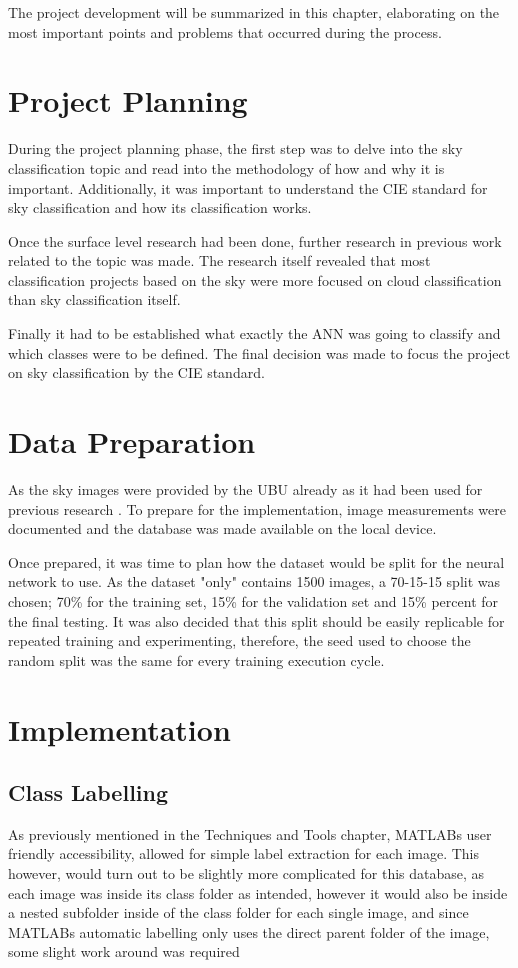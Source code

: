 
The project development will be summarized in this chapter, elaborating on the most important points and problems that occurred during the process.
\section{Project Planning}
During the project planning phase, the first step was to delve into the sky classification topic and read into the methodology of how and why it is important. Additionally, it was important to understand the CIE standard for sky classification and how its classification works. 

Once the surface level research had been done, further research in previous work related to the topic was made. The research itself revealed that most classification projects based on the sky were more focused on cloud classification than sky classification itself. 

Finally it had to be established what exactly the ANN was going to classify and which classes were to be defined. The final decision was made to focus the project on sky classification by the CIE standard.

\section{Data Preparation}
As the sky images were provided by the UBU already as it had been used for previous research \cite{skyClassANN-Granados-Lopéz}. To prepare for the implementation, image measurements were documented and the database was made available on the local device. 

Once prepared, it was time to plan how the dataset would be split for the neural network to use. As the dataset "only" contains 1500 images, a 70-15-15 split was chosen; 70\% for the training set, 15\% for the validation set and 15\% percent for the final testing. It was also decided that this split should be easily replicable for repeated training and experimenting, therefore, the seed used to choose the random split was the same for every training execution cycle.

\section{Implementation}

\subsection{Class Labelling}
As previously mentioned in the Techniques and Tools chapter, MATLABs user friendly accessibility, allowed for simple label extraction for each image. This however, would turn out to be slightly more complicated for this database, as each image was inside its class folder as intended, however it would also be inside a nested subfolder inside of the class folder for each single image, and since MATLABs automatic labelling only uses the direct parent folder of the image, some slight work around was required

